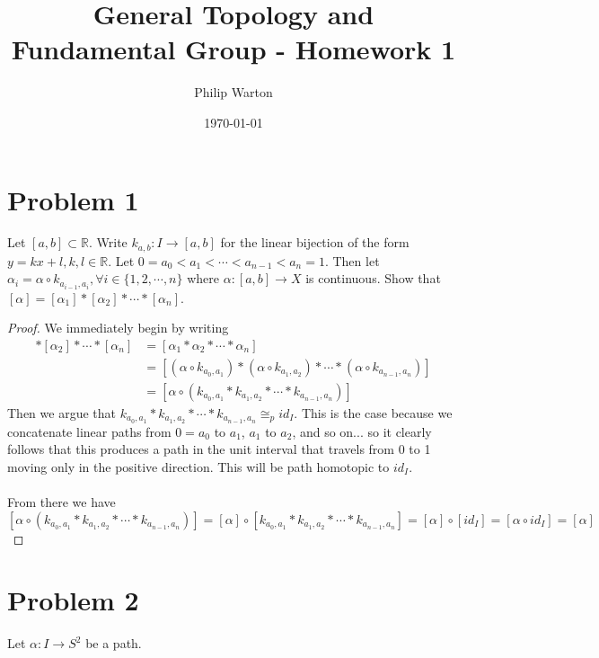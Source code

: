 \documentclass{article}
\theoremstyle{definition}
\begin{document}
\title{General Topology and Fundamental Group - Homework 1}
\author{Philip Warton}
\date{\today}
\maketitle
\section*{Problem 1}
\begin{mdframed}
    Let $[a,b] \subset \mathbb{R}$. Write $k_{a,b}:I \rightarrow [a,b]$ for the linear bijection 
    of the form $y = kx + l, k, l \in \mathbb{R}$. Let $0 = a_0 < a_1 < \cdots < a_{n-1} < a_n = 1$.
    Then let $\alpha_i = \alpha \circ k_{a_{i -1},a_i}, \forall i \in \{1,2,\cdots , n\}$ where $\alpha:[a,b] \rightarrow X$ is continuous. Show that $[\alpha] = [\alpha_1]*[\alpha_2]*\cdots * [\alpha_n]$.
\end{mdframed}
\begin{proof}
    We immediately begin by writing 
    \begin{align*}
        [\alpha_1] * [\alpha_2] * \cdots * [\alpha_n] &= [\alpha_1 * \alpha_2 * \cdots * \alpha_n] \\
        &= [(\alpha \circ k_{a_0,a_1}) * (\alpha \circ k_{a_1,a_2}) * \cdots * (\alpha \circ k_{a_{n-1},a_n})] \\
        &= [\alpha \circ (k_{a_0,a_1} * k_{a_1, a_2} * \cdots * k_{a_{n-1},a_n})]
    \end{align*}
    Then we argue that $k_{a_0,a_1} * k_{a_1, a_2} * \cdots * k_{a_{n-1},a_n} \cong_p id_I$.
    This is the case because we concatenate linear paths from $0 = a_0$ to $a_1$, $a_1$ to $a_2$, and so on...
    so it clearly follows that this produces a path in the unit interval that travels from 0 to 1 moving only in the positive direction.
    This will be path homotopic to $id_I$. \\\\ From there we have 
    \[
        [\alpha \circ (k_{a_0,a_1} * k_{a_1, a_2} * \cdots * k_{a_{n-1},a_n})] = [\alpha] \circ [k_{a_0,a_1} * k_{a_1, a_2} * \cdots * k_{a_{n-1},a_n}] = [\alpha] \circ [id_I] = [\alpha \circ id_I] = [\alpha]
    \]
\end{proof}
\section*{Problem 2}
Let $\alpha:I \rightarrow S^2$ be a path.
\end{document}
